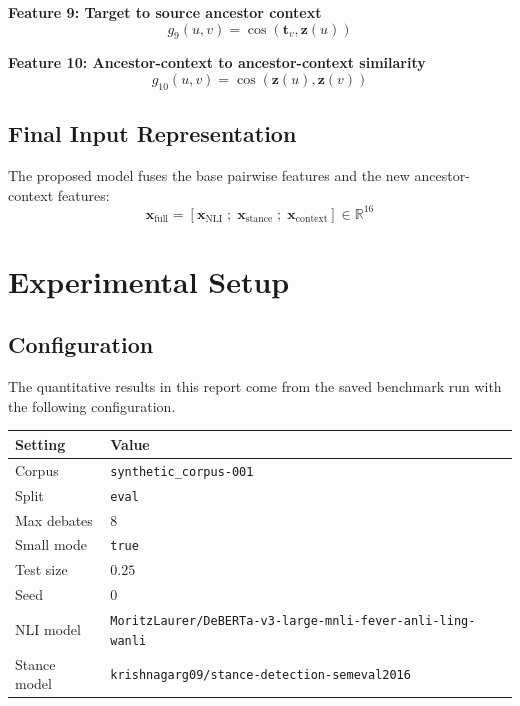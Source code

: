 \documentclass[11pt,a4paper]{article}
\begin{document}
\textbf{Feature 9: Target to source ancestor context}
\begin{equation}
g_9(u,v) = \cos(\mathbf{t}_v, \mathbf{z}(u))
\end{equation}

\textbf{Feature 10: Ancestor-context to ancestor-context similarity}
\begin{equation}
g_{10}(u,v) = \cos(\mathbf{z}(u), \mathbf{z}(v))
\end{equation}

\subsection{Final Input Representation}
The proposed model fuses the base pairwise features and the new ancestor-context features:
\begin{equation}
\mathbf{x}_{\text{full}} =
\left[
\mathbf{x}_{\text{NLI}} \; ; \; \mathbf{x}_{\text{stance}} \; ; \; \mathbf{x}_{\text{context}}
\right]
\in \mathbb{R}^{16}
\end{equation}

\section{Experimental Setup}
\subsection{Configuration}
The quantitative results in this report come from the saved benchmark run with the following configuration.

\begin{center}
\begin{tabular}{ll}
\toprule
Setting & Value \\
\midrule
Corpus & \texttt{synthetic\_corpus-001} \\
Split & \texttt{eval} \\
Max debates & \(8\) \\
Small mode & \texttt{true} \\
Test size & \(0.25\) \\
Seed & \(0\) \\
NLI model & \texttt{MoritzLaurer/DeBERTa-v3-large-mnli-fever-anli-ling-wanli} \\
Stance model & \texttt{krishnagarg09/stance-detection-semeval2016} \\
\bottomrule
\end{tabular}
\end{center}
\end{document}
